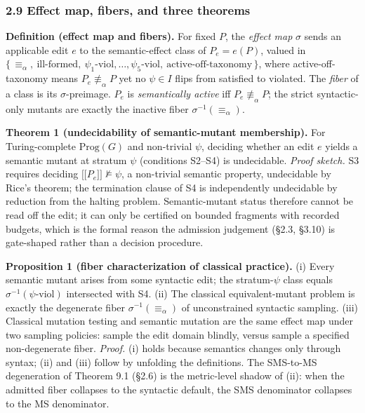 \documentclass[review,12pt,authoryear]{elsarticle}
\providecommand{\llbracket}{\mathopen{\lbrack\!\lbrack}}
\providecommand{\rrbracket}{\mathclose{\rbrack\!\rbrack}}
\begin{document}
\subsubsection{2.9 Effect map, fibers, and three theorems}\label{theory-fibers}

\textbf{Definition (effect map and fibers).} For fixed $P$, the
\emph{effect map} $\sigma$ sends an applicable edit $e$ to the
semantic-effect class of $P_e = e(P)$, valued in
$\{\, \equiv_\alpha,\ \text{ill-formed},\ \psi_1\text{-viol}, \dots, \psi_5\text{-viol},\ \text{active-off-taxonomy} \,\}$,
where active-off-taxonomy means $P_e \not\equiv_\alpha P$ yet no
$\psi \in I$ flips from satisfied to violated. The \emph{fiber} of a
class is its $\sigma$-preimage. $P_e$ is \emph{semantically active} iff
$P_e \not\equiv_\alpha P$; the strict syntactic-only mutants are exactly
the inactive fiber $\sigma^{-1}(\equiv_\alpha)$.

\textbf{Theorem 1 (undecidability of semantic-mutant membership).} For
Turing-complete $\mathrm{Prog}(G)$ and non-trivial $\psi$, deciding
whether an edit $e$ yields a semantic mutant at stratum $\psi$
(conditions S2--S4) is undecidable. \emph{Proof sketch.} S3 requires
deciding $\llbracket P_e \rrbracket \not\models \psi$, a non-trivial
semantic property, undecidable by Rice's theorem; the termination clause
of S4 is independently undecidable by reduction from the halting
problem. Semantic-mutant status therefore cannot be read off the edit;
it can only be certified on bounded fragments with recorded budgets,
which is the formal reason the admission judgement (§2.3, §3.10) is
gate-shaped rather than a decision procedure.

\textbf{Proposition 1 (fiber characterization of classical practice).}
(i) Every semantic mutant arises from some syntactic edit; the
stratum-$\psi$ class equals $\sigma^{-1}(\psi\text{-viol})$ intersected
with S4. (ii) The classical equivalent-mutant problem is exactly the
degenerate fiber $\sigma^{-1}(\equiv_\alpha)$ of unconstrained syntactic
sampling. (iii) Classical mutation testing and semantic mutation are the
same effect map under two sampling policies: sample the edit domain
blindly, versus sample a specified non-degenerate fiber. \emph{Proof.}
(i) holds because semantics changes only through syntax; (ii) and (iii)
follow by unfolding the definitions. The SMS-to-MS degeneration of
Theorem 9.1 (§2.6) is the metric-level shadow of (ii): when the admitted
fiber collapses to the syntactic default, the SMS denominator collapses
to the MS denominator.
\end{document}
